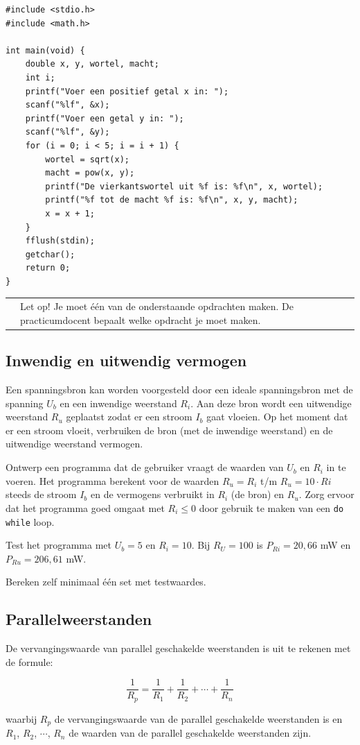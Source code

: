 \documentclass[a4paper,10pt,fleqn,twoside]{article}
\newcommand{\letop}{%
\vspace*{2ex}
\begin{mdframed}[outerlinewidth = 1 ,%
roundcorner = 4 pt,%
leftmargin = 40,%
rightmargin = 40,%
backgroundcolor = yellow!40,%
outerlinecolor = red!70!black,%
innertopmargin = \topskip,%
splittopskip = \topskip,%
]
\begin{tabularx}{\linewidth}{m{1cm}X}
\Large\leftpointright & Let op! Je moet één van de onderstaande opdrachten maken. De practicumdocent bepaalt welke opdracht je moet maken.
\end{tabularx}
\end{mdframed}
}
\begin{document}
\begin{lstlisting}
#include <stdio.h>
#include <math.h>

int main(void) {
    double x, y, wortel, macht;
    int i;
    printf("Voer een positief getal x in: ");
    scanf("%lf", &x);
    printf("Voer een getal y in: ");
    scanf("%lf", &y);
    for (i = 0; i < 5; i = i + 1) {
        wortel = sqrt(x);
        macht = pow(x, y);
        printf("De vierkantswortel uit %f is: %f\n", x, wortel);
        printf("%f tot de macht %f is: %f\n", x, y, macht);
        x = x + 1;
    }
    fflush(stdin);
    getchar();
    return 0;
}
\end{lstlisting}

\letop

\subsection{Inwendig en uitwendig vermogen}
Een spanningsbron kan worden voorgesteld door een ideale spanningsbron met de spanning $U_b$ en een inwendige weerstand $R_i$. Aan deze bron wordt een uitwendige weerstand $R_u$ geplaatst zodat er een stroom $I_b$ gaat vloeien. Op het moment dat er een stroom vloeit, verbruiken de bron (met de inwendige weerstand) en de uitwendige weerstand vermogen.

Ontwerp een programma dat de gebruiker vraagt de waarden van $U_b$ en $R_i$ in te voeren. Het programma berekent voor de waarden $R_u = R_i$ t/m $R_u = 10\cdot Ri$ steeds de stroom $I_b$ en de vermogens verbruikt in $R_i$ (de bron) en $R_u$. Zorg ervoor dat het programma goed omgaat met $R_i \leq 0$ door gebruik te maken van een \lstinline|do while| loop.

Test het programma met $U_b=5$ en $R_i=10$. Bij $R_U=100$ is $P_{Ri}=20,66$ mW en $P_{Ru}=206,61$ mW.

Bereken zelf minimaal één set met testwaardes.

\subsection{Parallelweerstanden}
De vervangingswaarde van parallel geschakelde weerstanden is uit te rekenen met de formule:

\begin{equation*}
\dfrac{1}{R_p} =\dfrac{1}{R_1} + \dfrac{1}{R_2} + \cdots + \dfrac{1}{R_n} 
\end{equation*}

waarbij $R_p$ de vervangingswaarde van de parallel geschakelde weerstanden is en $R_1$, $R_2$, $\cdots$, $R_n$ de waarden van de parallel geschakelde weerstanden zijn.
\end{document}

